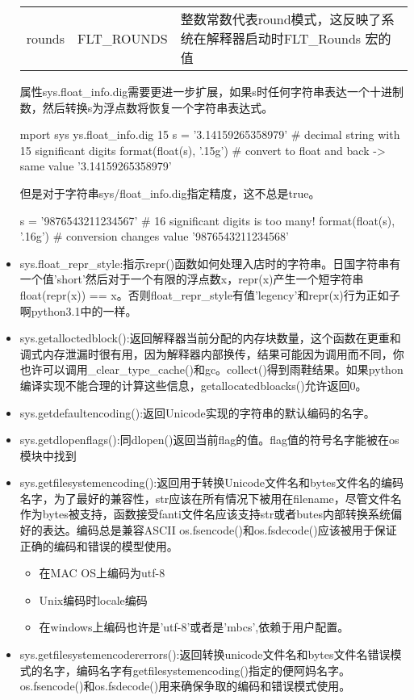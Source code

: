 \begin{itemize}
\begin{tabular}{lll}
rounds&FLT\_ROUNDS&整数常数代表round模式，这反映了系统在解释器启动时FLT\_Rounds 宏的值\\
\end{tabular}
属性sys.float\_info.dig需要更进一步扩展，如果s时任何字符串表达一个十进制数，然后转换s为浮点数将恢复一个字符串表达式。
\begin{python}
mport sys
ys.float_info.dig
15
s = '3.14159265358979'    # decimal string with 15 significant digits
format(float(s), '.15g')  # convert to float and back -> same value
'3.14159265358979'
\end{python}
但是对于字符串sys/float\_info.dig指定精度，这不总是true。
\begin{python}
s = '9876543211234567'    # 16 significant digits is too many!
format(float(s), '.16g')  # conversion changes value
'9876543211234568'
\end{python}
\item sys.float\_repr\_style:指示repr()函数如何处理入店时的字符串。日国字符串有一个值'short'然后对于一个有限的浮点数x，repr(x)产生一个短字符串float(repr(x)) == x。否则float\_repr\_style有值'legency'和repr(x)行为正如子啊python3.1中的一样。
\item sys.getalloctedblock():返回解释器当前分配的内存块数量，这个函数在更重和调式内存泄漏时很有用，因为解释器内部换传，结果可能因为调用而不同，你也许可以调用\_clear\_type\_cache()和gc。collect()得到雨鞋结果。如果python编译实现不能合理的计算这些信息，getallocatedbloacks()允许返回0。
\item sys.getdefaultencoding():返回Unicode实现的字符串的默认编码的名字。
\item sys.getdlopenflags():同dlopen()返回当前flag的值。flag值的符号名字能被在os模块中找到
\item sys.getfilesystemencoding():返回用于转换Unicode文件名和bytes文件名的编码名字，为了最好的兼容性，str应该在所有情况下被用在filename，尽管文件名作为bytes被支持，函数接受fanti文件名应该支持str或者butes内部转换系统偏好的表达。编码总是兼容ASCII
os.fsencode()和os.fsdecode()应该被用于保证正确的编码和错误的模型使用。
\begin{itemize}
\item 在MAC OS上编码为utf-8
\item Unix编码时locale编码
\item 在windows上编码也许是'utf-8'或者是'mbcs',依赖于用户配置。
\end{itemize}
\item sys.getfilesystemencodererrors():返回转换unicode文件名和bytes文件名错误模式的名字，编码名字有getfilesystemencoding()指定的便阿妈名字。os.fsencode()和os.fsdecode()用来确保争取的编码和错误模式使用。

\end{itemize}
